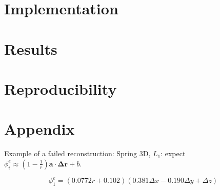 \documentclass[11pt]{article}
\begin{document}
    \section{Implementation}

    \section{Results}


    
    
    \section{Reproducibility}
    \section{Appendix}
    Example of a failed reconstruction:
    Spring 3D, $L_1$: expect $\phi^{e}_i \approx (1-\frac{1}{r})\mathbf{a} \cdot \mathbf{\Delta r} + b$.
    
    $$\phi^{e}_1 = (0.0772r + 0.102)(0.381 \Delta x - 0.190 \Delta y + \Delta z)$$

  
\end{document}
